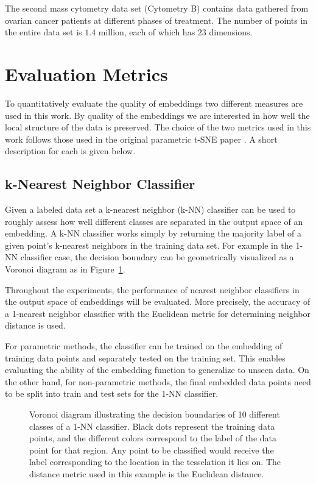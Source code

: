 The second mass cytometry data set (Cytometry B) contains data gathered from ovarian cancer patients at different phases of treatment. The number of points in the entire data set is $1.4$ million, each of which has $23$ dimensions.

\section{Evaluation Metrics}

To quantitatively evaluate the quality of embeddings two different measures are used in this work. By quality of the embeddings we are interested in how well the local structure of the data is preserved. The choice of the two metrics used in this work follows those used in the original parametric t-SNE paper \cite{parametric_tsne}. A short description for each is given below.

\subsection{k-Nearest Neighbor Classifier}

Given a labeled data set a k-nearest neighbor (k-NN) classifier can be used to roughly assess how well different classes are separated in the output space of an embedding. A k-NN classifier works simply by returning the majority label of a given point's k-nearest neighbors in the training data set. For example in the 1-NN classifier case, the decision boundary can be geometrically visualized as a Voronoi diagram as in Figure~\ref{fig:voronoi}.

Throughout the experiments, the performance of nearest neighbor classifiers in the output space of embeddings will be evaluated. More precisely, the accuracy of a 1-nearest neighbor classifier with the Euclidean metric for determining neighbor distance is used.

For parametric methods, the classifier can be trained on the embedding of training data points and separately tested on the training set. This enables evaluating the ability of the embedding function to generalize to unseen data. On the other hand, for non-parametric methods, the final embedded data points need to be split into train and test sets for the 1-NN classifier.

\begin{figure}[!htb]
  \centering
  \resizebox{0.5\textwidth}{!}{\unskip}
  \caption{Voronoi diagram illustrating the decision boundaries of 10 different classes of a 1-NN classifier. Black dots represent the training data points, and the different colors correspond to the label of the data point for that region. Any point to be classified would receive the label corresponding to the location in the tesselation it lies on. The distance metric used in this example is the Euclidean distance.}
  \label{fig:voronoi}
\end{figure}

